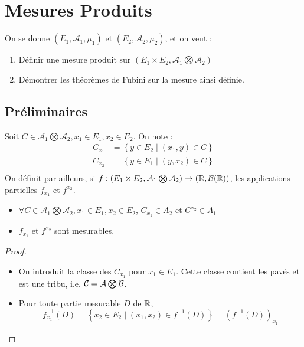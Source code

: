\documentclass{cours}
\begin{document}
\section{Mesures Produits}
On se donne $(E_{1}, \mathcal{A}_{1}, \mu_{1})$ et $(E_{2}, \mathcal{A}_{2}, \mu_{2})$, et on veut :
\begin{enumerate}
    \item Définir une mesure produit sur $\left(E_{1} \times E_{2}, \mathcal{A}_{1} \bigotimes \mathcal{A}_{2}\right)$
    \item Démontrer les théorèmes de Fubini sur la mesure ainsi définie.
\end{enumerate}
\subsection{Préliminaires}
\begin{definition}
    Soit $C \in \mathcal{A}_{1} \bigotimes \mathcal{A}_{2}, x_{1} \in E_{1}, x_{2} \in E_{2}$. On note :
    \[
        \begin{aligned}
            C_{x_{1}} & = \left\{y \in E_{2}\mid (x_{1}, y) \in C\right\} \\
            C_{x_{2}} & = \left\{y \in E_{1}\mid (y, x_{2}) \in C\right\} \\
        \end{aligned}
    \]
    On définit par ailleurs, si $f : \left(E_{1} \times E_{2}, \mathcal{A}_{1} \bigotimes \mathcal{A}_{2}\right) \to \left(\mathbb{R}, \mathcal{B}(\mathbb{R})\right)$, les applications partielles $f_{x_{1}}$ et $f^{x_{2}}$.
\end{definition}
\begin{lemma}
    \begin{itemize}
        \item $\forall C \in \mathcal{A}_{1} \bigotimes \mathcal{A}_{2}, x_{1} \in E_{1}, x_{2} \in E_{2}$, $C_{x_{1}} \in A_{2}$ et $C^{x_{2}} \in A_{1}$
        \item $f_{x_{1}}$ et $f^{x_{2}}$ sont mesurables.
    \end{itemize}
\end{lemma}
\begin{proof}
    \begin{itemize}
        \item On introduit la classe des $C_{x_{1}}$ pour $x_{1} \in E_{1}$. Cette classe contient les pavés et est une tribu, i.e. $\mathcal{C} = \mathcal{A} \bigotimes \mathcal{B}$.
        \item Pour toute partie mesurable $D$ de $\mathbb{R}$, \[f_{x_{1}}^{-1}\left(D\right) = \left\{x_{2} \in E_{2}\mid \left(x_{1}, x_{2}\right)\in f^{-1}\left(D\right)\right\} = \left(f^{-1}(D)\right)_{x_{1}}\]
    \end{itemize}
\end{proof}
\end{document}
